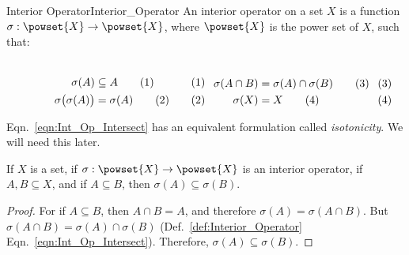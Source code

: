         \begin{fdefinition}{Interior Operator}{Interior_Operator}
            An interior operator on a set $X$ is a function
            $\sigma:\powset{X}\rightarrow\powset{X}$, where $\powset{X}$ is
            the power set of $X$, such that:
            \par
            \begin{subequations}
                \begin{minipage}[b]{0.49\textwidth}
                    \centering
                    \begin{align}
                        \label{eqn:Int_Op_Inclusion}%
                        \sigma(A)&\subseteq{A}\tag{1}\\
                        \label{eqn:Int_Op_Idemp}%
                        \sigma\big(\sigma(A)\big)&=\sigma(A)\tag{2}
                    \end{align}
                \end{minipage}
                \hfill
                \begin{minipage}[b]{0.49\textwidth}
                    \centering
                    \begin{align}
                        \label{eqn:Int_Op_Intersect}%
                        \sigma(A\cap{B})&=\sigma(A)\cap\sigma(B)\tag{3}\\
                        \label{eqn:Int_Op_Preserve_X}%
                        \sigma(X)&=X\tag{4}
                    \end{align}
                \end{minipage}
            \end{subequations}
            \par\vspace{2.5ex}
        \end{fdefinition}
        Eqn.~\ref{eqn:Int_Op_Intersect} has an equivalent formulation called
        \textit{isotonicity}. We will need this later.
        \begin{theorem}
            \label{thm:Int_Op_Isoton}%
            If $X$ is a set, if $\sigma:\powset{X}\rightarrow\powset{X}$ is
            an interior operator, if $A,B\subseteq{X}$, and if
            $A\subseteq{B}$, then $\sigma(A)\subseteq\sigma(B)$.
        \end{theorem}
        \begin{proof}
            For if $A\subseteq{B}$, then $A\cap{B}=A$, and therefore
            $\sigma(A)=\sigma(A\cap{B})$. But
            $\sigma(A\cap{B})=\sigma(A)\cap\sigma(B)$
            (Def.~\ref{def:Interior_Operator}
            Eqn.~\ref{eqn:Int_Op_Intersect}). Therefore,
            $\sigma(A)\subseteq\sigma(B)$.
        \end{proof}
